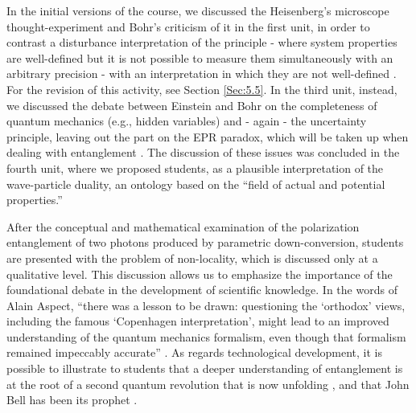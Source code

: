 \documentclass[twocolumn,secnumarabic,amssymb, nobibnotes, aps, prd, nofootinbib]{revtex4-2}
\begin{document}
In the initial versions of the course, we discussed the Heisenberg's microscope thought-experiment and Bohr's criticism of it in the first unit, in order to contrast a disturbance interpretation of the principle - where system properties are well-defined but it is not possible to measure them simultaneously with an arbitrary precision - with an interpretation in which they are not well-defined \cite{Tanona2004}. For the revision of this activity, see Section \ref{Sec:5.5}. In the third unit, instead, we discussed the debate between Einstein and Bohr on the completeness of quantum mechanics (e.g., hidden variables) and - again - the uncertainty principle, leaving out the part on the EPR paradox, which will be taken up when dealing with entanglement \cite{Schilpp1998}. The discussion of these issues was concluded in the fourth unit, where we proposed students, as a plausible interpretation of the wave-particle duality, an ontology based on the ``field of actual and potential properties.''

After the conceptual and mathematical examination of the polarization entanglement of two photons produced by parametric down-conversion, students are presented with the problem of non-locality, which is discussed only at a qualitative level. This discussion allows us to emphasize the importance of the foundational debate in the development of scientific knowledge. In the words of Alain Aspect, ``there was a lesson to be drawn: questioning the `orthodox' views, including the famous `Copenhagen interpretation', might lead to an improved understanding of the quantum mechanics formalism, even though that formalism remained impeccably accurate'' \cite[][p. xix]{Bell2010}. As regards technological development, it is possible to illustrate to students that a deeper understanding of entanglement is at the root of a second quantum revolution that is now unfolding \cite[e.g.,][]{House2018}, and that John Bell has been its prophet \cite{Bell2010}.
\end{document}
